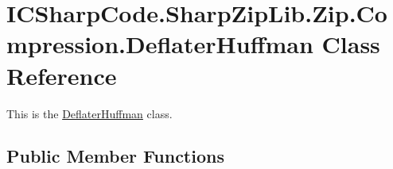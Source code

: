\hypertarget{class_i_c_sharp_code_1_1_sharp_zip_lib_1_1_zip_1_1_compression_1_1_deflater_huffman}{}\section{I\+C\+Sharp\+Code.\+Sharp\+Zip\+Lib.\+Zip.\+Compression.\+Deflater\+Huffman Class Reference}
\label{class_i_c_sharp_code_1_1_sharp_zip_lib_1_1_zip_1_1_compression_1_1_deflater_huffman}


This is the \hyperlink{class_i_c_sharp_code_1_1_sharp_zip_lib_1_1_zip_1_1_compression_1_1_deflater_huffman}{Deflater\+Huffman} class.  


\subsection*{Public Member Functions}
